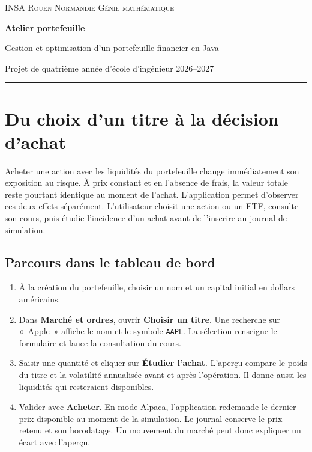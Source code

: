 \documentclass[11pt,a4paper]{article}
\newcommand{\code}[1]{\texttt{#1}}
\newcommand{\rubrique}[1]{\section*{\textcolor{foret}{#1}}}
\begin{document}
{\small\scshape INSA Rouen Normandie \hfill Génie mathématique}\\[1.4em]
{\Huge\bfseries\color{foret} Atelier portefeuille\par}
{\Large Gestion et optimisation d'un portefeuille financier en Java\par}
{\small Projet de quatrième année d'école d'ingénieur \hfill 2026--2027\par}
\medskip\hrule\medskip

\rubrique{Du choix d'un titre à la décision d'achat}

Acheter une action avec les liquidités du portefeuille change immédiatement son exposition au risque. À prix constant et en l'absence de frais, la valeur totale reste pourtant identique au moment de l'achat. L'application permet d'observer ces deux effets séparément. L'utilisateur choisit une action ou un ETF, consulte son cours, puis étudie l'incidence d'un achat avant de l'inscrire au journal de simulation.

\subsection*{Parcours dans le tableau de bord}
\begin{enumerate}
\item À la création du portefeuille, choisir un nom et un capital initial en dollars américains.
\item Dans \textbf{Marché et ordres}, ouvrir \textbf{Choisir un titre}. Une recherche sur «~Apple~» affiche le nom et le symbole \code{AAPL}. La sélection renseigne le formulaire et lance la consultation du cours.
\item Saisir une quantité et cliquer sur \textbf{Étudier l'achat}. L'aperçu compare le poids du titre et la volatilité annualisée avant et après l'opération. Il donne aussi les liquidités qui resteraient disponibles.
\item Valider avec \textbf{Acheter}. En mode Alpaca, l'application redemande le dernier prix disponible au moment de la simulation. Le journal conserve le prix retenu et son horodatage. Un mouvement du marché peut donc expliquer un écart avec l'aperçu.
\end{enumerate}
\end{document}
